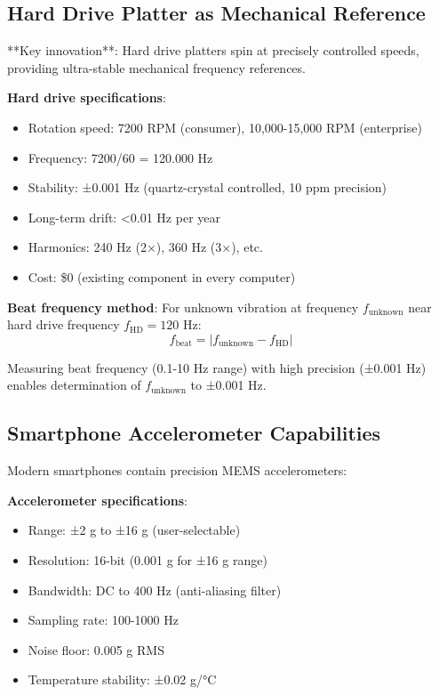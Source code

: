 \documentclass[12pt,a4paper]{article}
\begin{document}
\subsection{Hard Drive Platter as Mechanical Reference}

**Key innovation**: Hard drive platters spin at precisely controlled speeds, providing ultra-stable mechanical frequency references.

\textbf{Hard drive specifications}:
\begin{itemize}
\item Rotation speed: 7200 RPM (consumer), 10,000-15,000 RPM (enterprise)
\item Frequency: 7200/60 = 120.000 Hz
\item Stability: ±0.001 Hz (quartz-crystal controlled, 10 ppm precision)
\item Long-term drift: <0.01 Hz per year
\item Harmonics: 240 Hz (2×), 360 Hz (3×), etc.
\item Cost: \$0 (existing component in every computer)
\end{itemize}

\textbf{Beat frequency method}:
For unknown vibration at frequency $f_{\text{unknown}}$ near hard drive frequency $f_{\text{HD}} = 120$ Hz:
\begin{equation}
f_{\text{beat}} = |f_{\text{unknown}} - f_{\text{HD}}|
\end{equation}

Measuring beat frequency (0.1-10 Hz range) with high precision (±0.001 Hz) enables determination of $f_{\text{unknown}}$ to ±0.001 Hz.

\subsection{Smartphone Accelerometer Capabilities}

Modern smartphones contain precision MEMS accelerometers:

\textbf{Accelerometer specifications}:
\begin{itemize}
\item Range: ±2 g to ±16 g (user-selectable)
\item Resolution: 16-bit (0.001 g for ±16 g range)
\item Bandwidth: DC to 400 Hz (anti-aliasing filter)
\item Sampling rate: 100-1000 Hz
\item Noise floor: 0.005 g RMS
\item Temperature stability: ±0.02 g/°C
\end{itemize}
\end{document}
